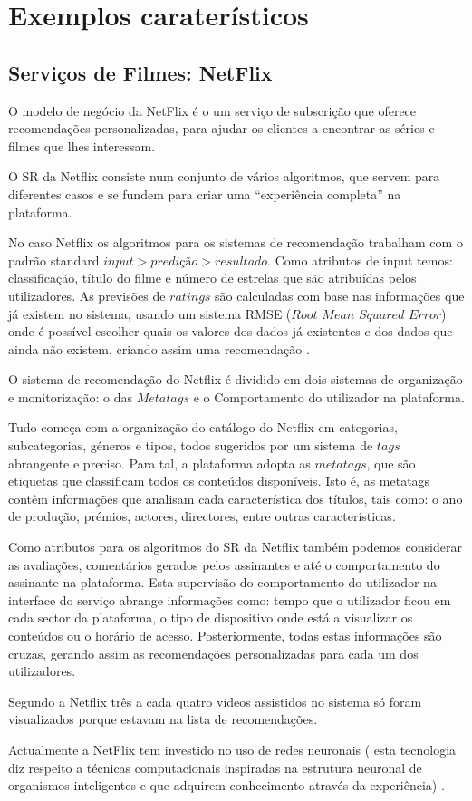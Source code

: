 \section{Exemplos caraterísticos}
\subsection{ Serviços de Filmes: NetFlix}
\par O modelo de negócio da NetFlix é o um serviço de subscrição que oferece recomendações personalizadas, para ajudar os clientes a encontrar as séries e filmes que lhes interessam.
\par O SR da Netflix consiste num conjunto de vários algoritmos, que servem para diferentes casos e se fundem para criar uma “experiência completa” na plataforma.
\par No caso Netflix os algoritmos para os sistemas de recomendação trabalham com o padrão standard $input> predição> resultado$. Como atributos de input temos: classificação, título do filme e número de estrelas que são atribuídas pelos utilizadores. As previsões de $ratings$ são calculadas com base nas informações que já existem no sistema, usando um sistema RMSE ($Root$ $Mean$ $Squared$ $Error$) onde é possível escolher quais os valores dos dados já existentes e dos dados que ainda não existem, criando assim uma recomendação \cite{ref_url1}.
\par O sistema de recomendação do Netflix é dividido em dois sistemas de organização e monitorização: o das $Metatags$ e o Comportamento do utilizador na plataforma. 
\par Tudo começa com a organização do catálogo do Netflix em categorias, subcategorias, géneros e tipos, todos sugeridos por um sistema de $tags$ abrangente e preciso. Para tal, a plataforma adopta as $metatags$, que são etiquetas que classificam todos os conteúdos disponíveis. Isto é, as metatags contêm informações que analisam cada característica dos títulos, tais como: o ano de produção, prémios, actores, directores, entre outras características. 
\par Como atributos para os algoritmos do SR da Netflix também podemos considerar as avaliações, comentários gerados pelos assinantes e até o comportamento do assinante na plataforma. Esta supervisão do comportamento do utilizador na interface do serviço abrange informações como: tempo que o utilizador ficou em cada sector da plataforma, o tipo de dispositivo onde está a visualizar os conteúdos ou o horário de acesso. Posteriormente, todas estas informações são cruzas, gerando assim as recomendações personalizadas para cada um dos utilizadores. \par Segundo a Netflix três a cada quatro vídeos assistidos no sistema só foram visualizados porque estavam na lista de recomendações. 
\par Actualmente a NetFlix tem investido no uso de redes neuronais ( esta tecnologia diz respeito a técnicas computacionais inspiradas na estrutura neuronal de organismos inteligentes e que adquirem conhecimento através da experiência) \cite{ref_url2}.





